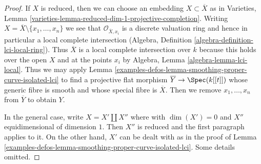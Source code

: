 \begin{proof}
If $X$ is reduced, then we can choose an embedding
$X \subset \overline{X}$ as in
Varieties, Lemma \ref{varieties-lemma-reduced-dim-1-projective-completion}.
Writing $X = \overline{X} \setminus \{x_1, \ldots, x_n\}$
we see that $\mathcal{O}_{\overline{X}, x_i}$ is a discrete
valuation ring and hence in particular a local complete intersection
(Algebra, Definition \ref{algebra-definition-lci-local-ring}).
Thus $\overline{X}$ is a local complete intersection
over $k$ because this holds over the open $X$ and
at the points $x_i$ by Algebra, Lemma \ref{algebra-lemma-lci-local}.
Thus we may apply Lemma \ref{examples-defos-lemma-smoothing-proper-curve-isolated-lci}
to find a projective flat morphism $\overline{Y} \to \Spec(k[[t]])$
whose generic fibre is smooth and whose special fibre
is $\overline{X}$. Then we remove $x_1, \ldots, x_n$
from $\overline{Y}$ to obtain $Y$.

\medskip\noindent
In the general case, write $X = X' \amalg X''$ where
with $\dim(X') = 0$ and $X''$ equidimensional of dimension $1$.
Then $X''$ is reduced and the first paragraph applies to it.
On the other hand, $X'$ can be dealt with
as in the proof of Lemma \ref{examples-defos-lemma-smoothing-proper-curve-isolated-lci}.
Some details omitted.
\end{proof}



